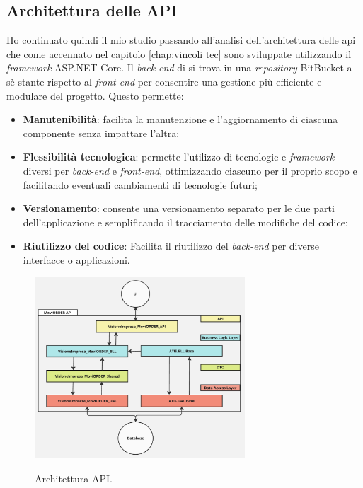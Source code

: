 \subsection{Architettura delle API}
Ho continuato quindi il mio studio passando all'analisi dell'architettura delle \gls{api} che come accennato nel capitolo 
\ref{chap:vincoli tec} sono sviluppate utilizzando il \textit{framework} ASP.NET Core. 
Il \textit{back-end} di {\movi} si trova in una \textit{repository} BitBucket a sè stante rispetto al \textit{front-end} per consentire 
una gestione più efficiente e modulare del progetto. Questo permette: 
\begin{itemize}
    \item \textbf{Manutenibilità}: facilita la manutenzione e l'aggiornamento di ciascuna componente senza impattare l'altra;
    \item \textbf{Flessibilità tecnologica}: permette l'utilizzo di tecnologie e \textit{framework} diversi per \textit{back-end} e 
          \textit{front-end}, ottimizzando ciascuno per il proprio scopo e facilitando eventuali cambiamenti di tecnologie futuri;
    \item \textbf{Versionamento}: consente una versionamento separato per le due parti dell'applicazione e semplificando il 
          tracciamento delle modifiche del codice;
    \item \textbf{Riutilizzo del codice}: Facilita il riutilizzo del \textit{back-end} per diverse interfacce o applicazioni.
\end{itemize}

\begin{figure}[H]
    \centering
    \includegraphics[alt={Architettura API}, width=0.7\textwidth]{img/multilayered.png}
    \caption {Architettura API.}
    \label{fig:multilayered}
\end{figure}

